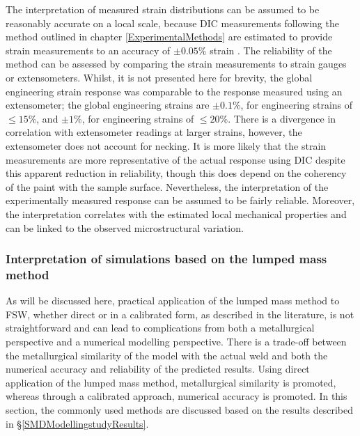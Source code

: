 The interpretation of measured strain distributions can be assumed to be reasonably accurate on a local scale, because DIC measurements following the method outlined in chapter \ref{ExperimentalMethods} are estimated to provide strain measurements to an accuracy of $\pm 0.05$\% strain \cite{DaFonseca2005}. The reliability of the method can be assessed by comparing the strain measurements to strain gauges or extensometers. Whilst, it is not presented here for brevity, the global engineering strain response was comparable to the response measured using an extensometer; the global engineering strains are $\pm 0.1$\%, for engineering strains of $\leq 15$\%, and $\pm 1$\%, for engineering strains of $\leq 20$\%. There is a divergence in correlation with extensometer readings at larger strains, however, the extensometer does not account for necking. It is more likely that the strain measurements are more representative of the actual response using DIC despite this apparent reduction in reliability, though this does depend on the coherency of the paint with the sample surface. Nevertheless, the interpretation of the experimentally measured response can be assumed to be fairly reliable. Moreover, the interpretation correlates with the estimated local mechanical properties and can be linked to the observed microstructural variation.

\subsubsection{Interpretation of simulations based on the lumped mass method}
\label{SMDModellingstudyDiscussionLumpedMassMethod}
As will be discussed here, practical application of the lumped mass method to FSW, whether direct or in a calibrated form, as described in the literature, is not straightforward and can lead to complications from both a metallurgical perspective and a numerical modelling perspective. There is a trade-off between the metallurgical similarity of the model with the actual weld and both the numerical accuracy and reliability of the predicted results. Using direct application of the lumped mass method, metallurgical similarity is promoted, whereas through a calibrated approach, numerical accuracy is promoted. In this section, the commonly used methods are discussed based on the results described in \S\ref{SMDModellingstudyResults}. 

